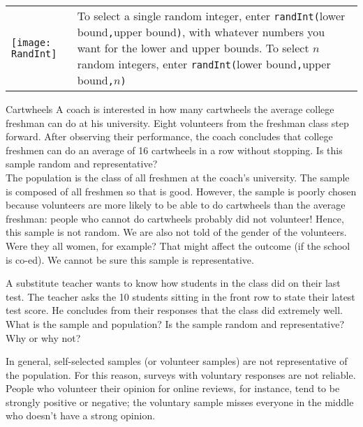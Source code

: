 \begin{center}
\begin{tabular}{l b{}}
\texttt{[image: RandInt]} & To select a single random integer, enter \texttt{randInt(}lower bound\texttt{,}upper bound\texttt{)}, with whatever numbers you want for the lower and upper bounds.  To select $n$ random integers, enter \texttt{randInt(}lower bound\texttt{,}upper bound\texttt{,}$n$\texttt{)}
\end{tabular}
\end{center}
\vfill
\pagebreak

\begin{example}[https://www.youtube.com/watch?v=mm1iQfMgNHE]{Cartwheels}
A coach is interested in how many cartwheels the average college freshman can do at his university. Eight volunteers from the freshman class step forward. After observing their
performance, the coach concludes that college freshmen can do an average of 16 cartwheels in a row without stopping. Is this sample random and representative?\\

The population is the class of all freshmen at the coach's university. The sample is composed of all freshmen so that is good. However, the sample is poorly chosen because volunteers are more likely to be able to do cartwheels than the average freshman: people who cannot do cartwheels probably did not volunteer! Hence, this sample is not random. We are also not told of the gender of the volunteers. Were they all women, for example? That might affect the outcome (if the school is co-ed). We cannot be sure this sample is representative.

\end{example}

\begin{try}
A substitute teacher wants to know how students in the class did on their last test. The teacher asks the 10 students sitting in the front row to state their latest test score. He concludes from their responses that the class did extremely well. What is the sample and population? Is the sample random and representative? Why or why not?
\end{try}

In general, self-selected samples (or volunteer samples) are not representative of the population.  For this reason, surveys with voluntary responses are not reliable.  People who volunteer their opinion for online reviews, for instance, tend to be strongly positive or negative; the voluntary sample misses everyone in the middle who doesn't have a strong opinion.

